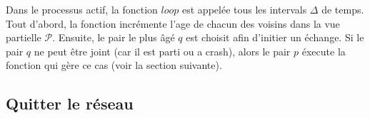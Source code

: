 Dans le processus actif, la fonction $loop$ est appelée tous les intervals
$\Delta$ de temps. Tout d'abord, la fonction incrémente l'age de chacun des
voisins dans la vue partielle $\mathcal{P}$. Ensuite, le pair le plus âgé $q$
est choisit afin d'initier un échange. Si le pair $q$ ne peut être joint (car il
est parti ou a crash), alors le pair $p$ éxecute la fonction qui gère ce cas
(voir la section suivante). 

\subsection{Quitter le réseau}

